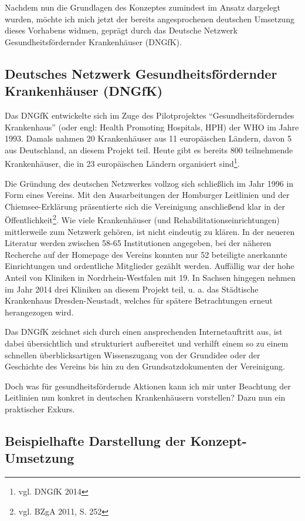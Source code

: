 Nachdem nun die Grundlagen des Konzeptes zumindest im Ansatz dargelegt wurden, möchte ich mich jetzt der bereits angesprochenen deutschen Umsetzung dieses Vorhabens widmen, geprägt durch das Deutsche Netzwerk Gesundheitsfördernder Krankenhäuser (DNGfK).

\subsection{Deutsches Netzwerk Gesundheitsfördernder Krankenhäuser (DNGfK)}
\label{sec:DeutschesNetzwerkGesundheitsfördernderKrankenhäuserDNGfK}

Das DNGfK entwickelte sich im Zuge des Pilotprojektes "`Gesundheitsförderndes Krankenhaus"' (oder engl: Health Promoting Hospitals, HPH) der WHO im Jahre 1993. Damals nahmen 20 Krankenhäuser aus 11 europäischen Ländern, davon 5 aus Deutschland, an diesem Projekt teil. Heute gibt es bereits 800 teilnehmende Krankenhäuser, die in 23 europäischen Ländern organisiert sind\footnote{vgl. DNGfK 2014}.

Die Gründung des deutschen Netzwerkes vollzog sich schließlich im Jahr 1996 in Form eines Vereins. Mit den Ausarbeitungen der Homburger Leitlinien und der Chiemsee-Erklärung präsentierte sich die Vereinigung anschließend klar in der Öffentlichkeit\footnote{vgl. BZgA 2011, S. 252}. Wie viele Krankenhäuser (und Rehabilitationseinrichtungen) mittlerweile zum Netzwerk gehören, ist nicht eindeutig zu klären. In der neueren Literatur werden zwischen 58-65 Institutionen angegeben, bei der näheren Recherche auf der Homepage des Vereins konnten nur 52 beteiligte anerkannte Einrichtungen und ordentliche Mitglieder gezählt werden. Auffällig war der hohe Anteil von Kliniken in Nordrhein-Westfalen mit 19. In Sachsen hingegen nehmen im Jahr 2014 drei Kliniken an diesem Projekt teil, u. a. das Städtische Krankenhaus Dresden-Neustadt, welches für spätere Betrachtungen erneut herangezogen wird.

Das DNGfK zeichnet sich durch einen ansprechenden Internetauftritt aus, ist dabei übersichtlich und strukturiert aufbereitet und verhilft einem so zu einem schnellen überblicksartigen Wissenszugang von der Grundidee oder der Geschichte des Vereins bis hin zu den Grundsatzdokumenten der Vereinigung.

Doch was für gesundheitsfördernde Aktionen kann ich mir unter Beachtung der Leitlinien nun konkret in deutschen Krankenhäusern vorstellen? Dazu nun ein praktischer Exkurs.

\subsection{Beispielhafte Darstellung der Konzept-Umsetzung}
\label{sec:BeispielhafteDarstellungDerKonzeptUmsetzung}

